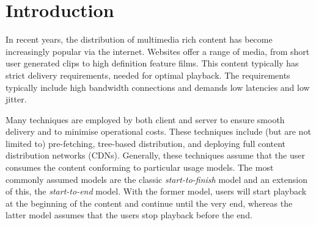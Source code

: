 \chapter{Introduction}
\label{chap:intro}


%
%
%


In recent years, the distribution of multimedia rich content has become increasingly popular via the internet. Websites offer a range of media, from short user generated clips to high definition feature films. This content typically has strict delivery requirements, needed for optimal playback. The requirements typically include high bandwidth connections and demands low latencies and low jitter.

Many techniques are employed by both client and server to ensure smooth delivery and to minimise operational costs. These techniques include (but are not limited to) pre-fetching, tree-based distribution, and deploying full content distribution networks (CDNs). Generally, these techniques assume that the user consumes the content conforming to particular usage models. The most commonly assumed models are the classic \emph{start-to-finish} model and an extension of this, the \emph{start-to-end} model. With the former model, users will start playback at the beginning of the content and continue until the very end, whereas the latter model assumes that the users stop playback before the end.

